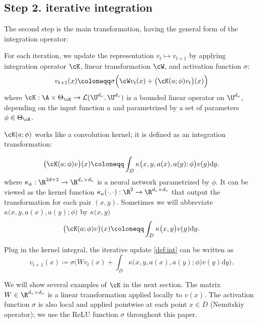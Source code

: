 \subsection{Step 2. iterative integration} 
\label{ssec:step2}
The second step is the main transformation, having the general form of the integration operator:

\begin{definition}
For each iteration, we update the representation $v_t \mapsto v_{t+1}$ by applying integration operator $\cK$, linear transformation $\cW$, and activation function $\sigma$:
\begin{equation}\label{def:int}
v_{t+1}(x) \coloneqq \sigma\Big( \cW v_t(x) 
+ \bigl(\cK(a;\phi)v_t\bigr)(x) \Big)
\end{equation}
where $\cK: \A \times \Theta_{\cK} \to \mathcal{L}(\U^{d_v},\U^{d_v})$ is a bounded linear operator on $\U^{d_v}$, depending on the input function $a$ and parametrized by a set of parameters $\phi \in \Theta_{\cK}$.
\end{definition}

$\cK(a;\phi)$ works like a convolution kernel; it is defined as an integration transformation: 
\begin{definition}
\begin{equation}
\label{def:K_int}
\bigl(\cK(a;\phi)v\bigr)(x) \coloneqq  
\int_{D} \kappa\big(x,y,a(x),a(y);\phi\big) v(y) \mathrm{d}y. 
\end{equation}
where $\kappa_{\phi}: \R^{2d+2} \to \R^{d_v \times d_v}$ is a neural network parametrized by $\phi$. It can be viewed as the kernel function $\kappa_a(\cdot,\cdot): \R^2 \to \R^{d_v \times d_v}$ that output the transformation for each pair $(x,y)$. Sometimes we will abbreviate $\kappa\big(x,y,a(x),a(y);\phi\big)$ by $\kappa\big(x,y\big)$
\begin{equation}
\label{def:K_int_short}
\bigl(\cK(a;\phi)v\bigr)(x) \coloneqq  
\int_{D} \kappa\big(x,y\big) v(y) \mathrm{d}y. 
\end{equation}
\end{definition}


Plug in the kernel integral, the iterative update \eqref{def:int} can be written as
\begin{equation}
\label{def:neural_operator}
v_{t+1}(x) \coloneqq \sigma\Big( W v_t(x) + 
\int_{D} \kappa\big(x,y,a(x),a(y);\phi\big) v(y) \mathrm{d}y \Big).  
\end{equation}

We will show several examples of $\cK$ in the next section.
The matrix $W \in \R^{d_v \times d_v}$ is a linear transformation applied locally to $v(x)$. The activation function $\sigma$ is also local and applied pointwise at each point $x \in D$ (Nemitskiy operator); we use the ReLU function $\sigma$ throughout this paper. 

